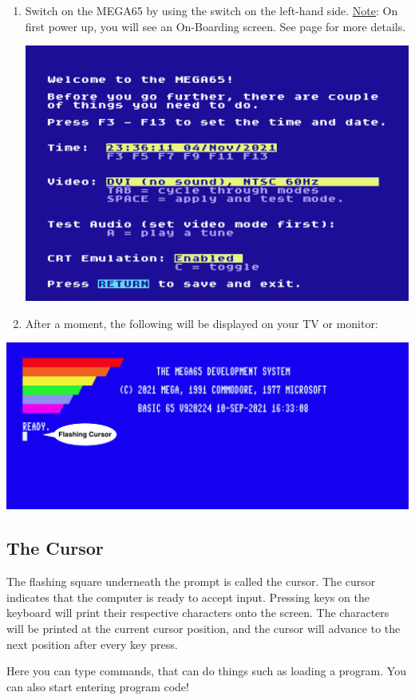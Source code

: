 \begin{enumerate}
	\item Switch on the MEGA65 by using the switch on the left-hand side. \newline \newline
    \underline{Note}: On first power up, you will see an On-Boarding screen. See page \pageref{onboarding} for more details. \newline
    \begin{center}%
      \includegraphics[trim= 10mm 140mm 10mm 10mm,clip,width=0.9\linewidth]{images/img011_final_boot_01.png}%
    \end{center}
	\item After a moment, the following will be displayed on your TV or monitor:
\end{enumerate}

\includegraphics[width=\linewidth]{images/introduction-screen/switched-on.png}

\subsection{The Cursor}

The flashing square underneath the  prompt is called the cursor. The cursor indicates that the computer is ready to accept input. Pressing keys on the keyboard will print their respective characters onto the screen. The characters will be printed at the current cursor position, and the cursor will advance to the next position after every key press.

Here you can type commands, that can do things such as loading a program. You can also start entering program code!
